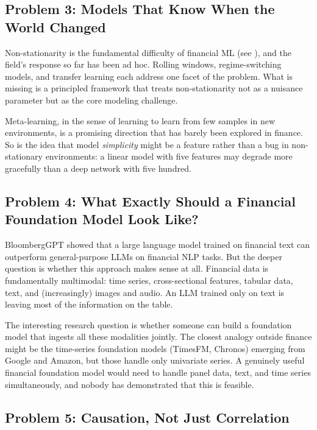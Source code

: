 \subsection{Problem 3: Models That Know When the World Changed}

Non-stationarity is the fundamental difficulty of financial ML (see ), and the field's response so far has been ad hoc. Rolling windows, regime-switching models, and transfer learning each address one facet of the problem. What is missing is a principled framework that treats non-stationarity not as a nuisance parameter but as the core modeling challenge.

Meta-learning, in the sense of learning to learn from few samples in new environments, is a promising direction that has barely been explored in finance. So is the idea that model \textit{simplicity} might be a feature rather than a bug in non-stationary environments: a linear model with five features may degrade more gracefully than a deep network with five hundred.

\subsection{Problem 4: What Exactly Should a Financial Foundation Model Look Like?}

BloombergGPT \citep{Wu2023} showed that a large language model trained on financial text can outperform general-purpose LLMs on financial NLP tasks. But the deeper question is whether this approach makes sense at all. Financial data is fundamentally multimodal: time series, cross-sectional features, tabular data, text, and (increasingly) images and audio. An LLM trained only on text is leaving most of the information on the table.

The interesting research question is whether someone can build a foundation model that ingests all these modalities jointly. The closest analogy outside finance might be the time-series foundation models (TimesFM, Chronos) emerging from Google and Amazon, but those handle only univariate series. A genuinely useful financial foundation model would need to handle panel data, text, and time series simultaneously, and nobody has demonstrated that this is feasible.

\subsection{Problem 5: Causation, Not Just Correlation}

